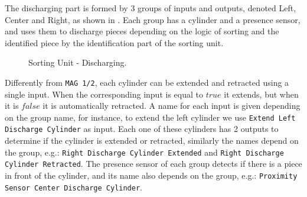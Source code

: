The discharging part is formed by 3 groups of inputs and outputs, denoted Left, Center and
Right, as shown in . 
Each group has a cylinder and a presence sensor, and uses them to discharge pieces
depending on the logic of sorting and the identified piece by the identification
part of the sorting unit.
\begin{figure}[H]
  \centering
  \caption{Sorting Unit - Discharging.}
  \label{fig:sortDisc}
\end{figure}
Differently from \verb|MAG 1/2|, each cylinder can be extended and retracted
using a single input. When the corresponding input is equal to $true$ it
extends, but when it is $false$ it is automatically retracted.
A name for each input is given depending on the group name, for
instance, to extend the left cylinder we use
\verb|Extend Left Discharge Cylinder| as input.
Each one of these cylinders has 2 outputs to determine if the cylinder is
extended or retracted, similarly the names depend on the group, e.g.:
\verb|Right Discharge Cylinder Extended| and
\verb|Right Discharge Cylinder Retracted|.
The presence sensor of each group detects if there is a piece in front of the
cylinder, and its name also depends on the group, e.g.:
\verb|Proximity Sensor Center Discharge Cylinder|.

